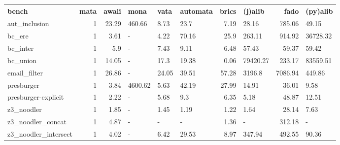 \begin{tabular}{lrrlllrlrl}
\hline
 bench                &   mata &   awali & mona    & vata   & automata   &   brics & (j)alib   &    fado & (py)alib   \\
\hline
 aut\_inclusion        &      1 &   23.29 & 460.66  & 8.73   & 23.7       &    7.19 & 28.16     &  785.06 & 49.15      \\
 bc\_ere               &      1 &    3.61 & -       & 4.22   & 70.16      &   25.9  & 263.11    &  914.92 & 36728.32   \\
 bc\_inter             &      1 &    5.9  & -       & 7.43   & 9.11       &    6.48 & 57.43     &   59.37 & 59.42      \\
 bc\_union             &      1 &   14.05 & -       & 17.3   & 19.38      &    0.06 & 79420.27  &  233.17 & 83559.51   \\
 email\_filter         &      1 &   26.86 & -       & 24.05  & 39.51      &   57.28 & 3196.8    & 7086.94 & 449.86     \\
 presburger           &      1 &    3.84 & 4600.62 & 5.63   & 42.19      &   27.99 & 14.91     &   36.01 & 9.58       \\
 presburger-explicit  &      1 &    2.22 & -       & 5.68   & 9.3        &    6.35 & 5.18      &   48.87 & 12.51      \\
 z3\_noodler           &      1 &    1.85 & -       & 1.45   & 1.19       &    1.22 & 1.64      &   28.14 & 7.63       \\
 z3\_noodler\_concat    &      1 &    4.87 & -       & -      & -          &    1.36 & -         &  312.18 & -          \\
 z3\_noodler\_intersect &      1 &    4.02 & -       & 6.42   & 29.53      &    8.97 & 347.94    &  492.55 & 90.36      \\
\hline
\end{tabular}